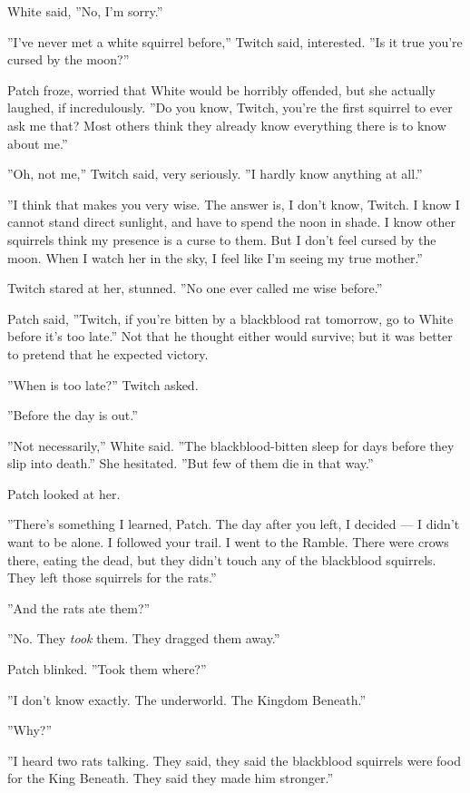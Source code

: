 \documentclass[12pt]{book}
\begin{document}
White said, ''No, I'm sorry.''

''I've never met a white squirrel before,'' Twitch said, interested. ''Is it true you're cursed by the moon?''

Patch froze, worried that White would be horribly offended, but she actually laughed, if incredulously. ''Do you know, Twitch, you're the first squirrel to ever ask me that? Most others think they already know everything there is to know about me.''

''Oh, not me,'' Twitch said, very seriously. ''I hardly know anything at all.''

''I think that makes you very wise. The answer is, I don't know, Twitch. I know I cannot stand direct sunlight, and have to spend the noon in shade. I know other squirrels think my presence is a curse to them. But I don't feel cursed by the moon. When I watch her in the sky, I feel like I'm seeing my true mother.''

Twitch stared at her, stunned. ''No one ever called me wise before.''

Patch said, ''Twitch, if you're bitten by a blackblood rat tomorrow, go to White before it's too late.'' Not that he thought either would survive; but it was better to pretend that he expected victory.

''When is too late?'' Twitch asked.

''Before the day is out.''

''Not necessarily,'' White said. ''The blackblood-bitten sleep for days before they slip into death.'' She hesitated. ''But few of them die in that way.''

Patch looked at her.

''There's something I learned, Patch. The day after you left, I decided ---
I didn't want to be alone. I followed your trail. I went to the Ramble. There were crows there, eating the dead, but they didn't touch any of the blackblood squirrels. They left those squirrels for the rats.''

''And the rats ate them?''

''No. They {\it took} them. They dragged them away.''

Patch blinked. ''Took them where?''

''I don't know exactly. The underworld. The Kingdom Beneath.''

''Why?''

''I heard two rats talking. They said, they said the blackblood squirrels were food for the King Beneath. They said they made him stronger.''
\end{document}
